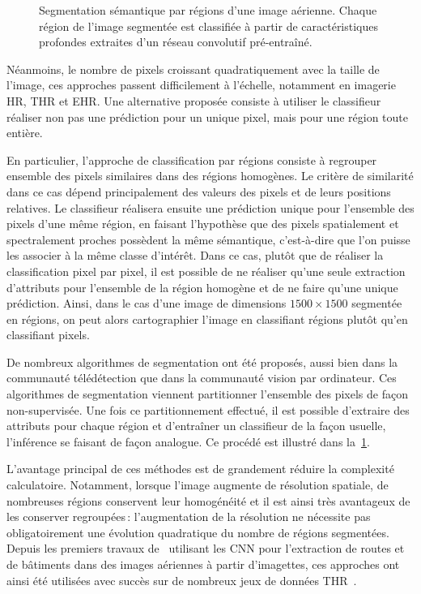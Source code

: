 \begin{figure}
\resizebox{\textwidth}{!}{%

}
\caption{Segmentation sémantique par régions d'une image aérienne. Chaque région de l'image segmentée est classifiée à partir de caractéristiques profondes extraites d'un réseau convolutif pré-entraîné.}
\label{fig:framework}
\end{figure}

Néanmoins, le nombre de pixels croissant quadratiquement avec la taille de l'image, ces approches passent difficilement à l'échelle, notamment en imagerie \gls{HR}, \gls{THR} et \gls{EHR}. Une alternative proposée consiste à utiliser le classifieur réaliser non pas une prédiction pour un unique pixel, mais pour une région toute entière.

En particulier, l'approche de classification par régions consiste à regrouper ensemble des pixels similaires dans des régions homogènes. Le critère de similarité dans ce cas dépend principalement des valeurs des pixels et de leurs positions relatives. Le classifieur réalisera ensuite une prédiction unique pour l'ensemble des pixels d'une même région, en faisant l'hypothèse que des pixels spatialement et spectralement proches possèdent la même sémantique, c'est-à-dire que l'on puisse les associer à la même classe d'intérêt. Dans ce cas, plutôt que de réaliser la classification pixel par pixel, il est possible de ne réaliser qu'une seule extraction d'attributs pour l'ensemble de la région homogène et de ne faire qu'une unique prédiction. Ainsi, dans le cas d'une image de dimensions $1 500\times1 500$ segmentée en  régions, on peut alors cartographier l'image en classifiant  régions plutôt qu'en classifiant  pixels.

De nombreux algorithmes de segmentation ont été proposés, aussi bien dans la communauté télédétection que dans la communauté vision par ordinateur. Ces algorithmes de segmentation viennent partitionner l'ensemble des pixels de façon non-supervisée. Une fois ce partitionnement effectué, il est possible d'extraire des attributs pour chaque région et d'entraîner un classifieur de la façon usuelle, l'inférence se faisant de façon analogue. Ce procédé est illustré dans la~\cref{fig:framework}.

L'avantage principal de ces méthodes est de grandement réduire la complexité calculatoire. Notamment, lorsque l'image augmente de résolution spatiale, de nombreuses régions conservent leur homogénéité et il est ainsi très avantageux de les conserver regroupées\,: l'augmentation de la résolution ne nécessite pas obligatoirement une évolution quadratique du nombre de régions segmentées. Depuis les premiers travaux de~\citet{mnih_machine_2013} utilisant les \gls{CNN} pour l'extraction de routes et de bâtiments dans des images aériennes à partir d'imagettes, ces approches ont ainsi été utilisées avec succès sur de nombreux jeux de données \gls{THR}~\cite{lagrange_benchmarking_2015,vargas_superpixel-based_2014}.

